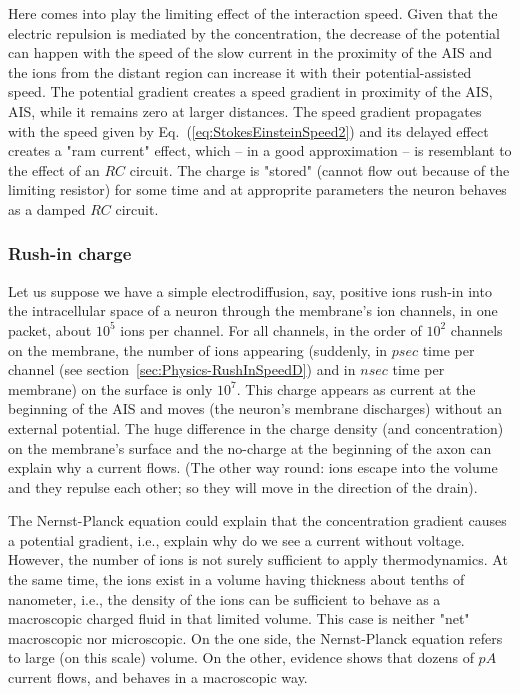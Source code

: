 Here comes into play the limiting effect of the interaction speed.
Given that the electric repulsion is mediated by the concentration, 
the decrease of the potential can happen with the speed of the slow current
in the proximity of the 
AIS and the ions from the distant region can increase it with their potential-assisted speed. 
The potential gradient creates a speed gradient in proximity of the \gls{AIS},
AIS, while it remains zero at larger distances. The speed gradient
propagates with the speed given by Eq.~(\ref{eq:StokesEinsteinSpeed2})
and its delayed effect creates a "ram current" effect, which 
-- in a good approximation -- is resemblant to the effect of an $RC$ circuit.
The charge is "stored" (cannot flow out because of the limiting resistor)
for some time and at approprite parameters the neuron behaves as a damped $RC$ circuit.




\subsubsection{Rush-in charge\label{sec:Physics-RushinCharge}}

Let us suppose we have a simple electrodiffusion, say, positive ions rush-in into the intracellular space of a neuron through the membrane's ion channels, in one packet, about $10^5$ ions per channel. For all channels, in the order of $10^2$ channels on the membrane, the number of ions appearing (suddenly, in $psec$ time per channel (see section~\ref{sec:Physics-RushInSpeedD}) and in $nsec$ time per membrane) on the surface is only $10^7$. This charge appears as current at the beginning of the
AIS and moves (the neuron's membrane discharges) without an external potential.
The huge difference in the charge density (and concentration) on the membrane's surface and the no-charge at the beginning of the axon can explain why a current flows. (The other way round: ions escape into the volume and they repulse each other; so they will move in the direction of the drain).

The Nernst-Planck equation could explain that the concentration gradient causes a potential gradient, i.e., explain why do we see a current without voltage. However, the number of ions is not surely sufficient to apply thermodynamics.
At the same time, the ions exist in a volume having thickness about tenths of nanometer, i.e., the density of the ions can be sufficient to behave as a macroscopic charged fluid in that limited volume.
This case is neither "net" macroscopic nor microscopic. On the one side, the Nernst-Planck
 equation refers to large (on this scale) volume. On the other, evidence shows that dozens of $pA$ current flows, and behaves in a macroscopic way.  

